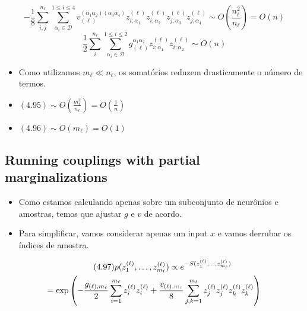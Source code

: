 \documentclass{beamer}
\newcommand{\Dcal}{\mathcal{D}}
\def\mi#1{{\alpha_{#1}}}
\def\eell{{(\ell)}}
\begin{document}
\begin{frame}
	\begin{equation*}\tag{4.95}
		-\frac{1}{8}\sum_{i,j}^{n_\ell} \sum_{\mi{i}\in\Dcal}^{1\le i \le 4} v^{(\mi1\mi2)(\mi3\mi4)}_{\eell} z_{i;\mi1}^\eell z_{i;\mi2}^\eell z_{j;\mi3}^\eell z_{j;\mi4}^\eell \sim O\left(\frac{n_\ell^2}{n_\ell}\right) = O(n)
	\end{equation*}
	\begin{equation*}\tag{4.96}
		\frac{1}{2} \sum_{i}^{n_\ell}\sum_{\mi{i}\in\Dcal}^{1\le i \le 2} g^{\mi1\mi2}_{\eell} z_{i;\mi1}^\eell z_{i;\mi2}^\eell \sim  O(n)
	\end{equation*}

	\begin{itemize}
		\item Como utilizamos $m_\ell \ll n_\ell$, os somatórios reduzem drasticamente o número de termos.
		\item $(4.95) \sim O\left(\frac{m_\ell^2}{n_\ell}\right) = O\left(\frac{1}{n}\right)$
		\item $(4.96) \sim O(m_\ell) = O(1)$
	\end{itemize}
\end{frame}

\subsection{Running couplings with partial marginalizations}

\begin{frame}
	\begin{itemize}
		\item Como estamos calculando apenas sobre um subconjunto de neurônios e amostras, temos que ajustar $g$ e $v$ de acordo.
		\item Para simplificar, vamos considerar apenas um input $x$ e vamos derrubar os índices de amostra.
	\end{itemize}
	\begin{multline*}\tag{4.97}
		p(z_1^\eell, \ldots, z_{m_\ell}^\eell ) \propto e^{-S(z_1^\eell, \ldots, z_{m_\ell}^\eell)}\\
		= \exp\left(-\frac{g_{\eell,m_\ell}}{2}\sum_{i=1}^{m_\ell}  z_i^\eell z_i^\eell + \frac{v_{\eell{\color{gray},m_\ell}}}{8}\sum_{j,k=1}^{m_\ell}  z_j^\eell z_j^\eell z_k^\eell z_k^\eell\right)
	\end{multline*}
\end{frame}
\end{document}
